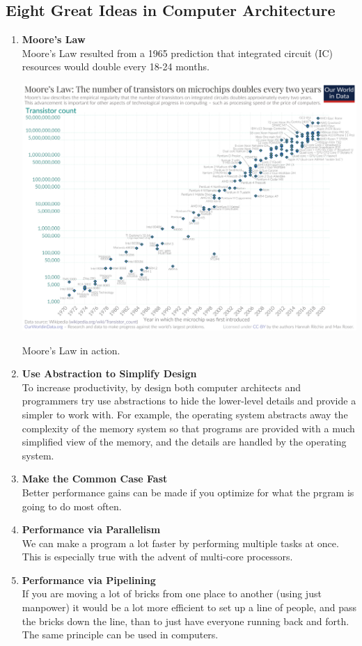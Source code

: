 \documentclass[10pt]{article}
\begin{document}
\subsection{Eight Great Ideas in Computer Architecture}\label{subsec:}
\begin{enumerate}
\item \textbf{Moore's Law}\\
  Moore's Law resulted from a 1965 prediction that integrated circuit (IC) resources would double every 18-24 months.
\begin{marginfigure}
  \begin{center}
    \includegraphics[width=\linewidth]{3.png}
  \end{center}
  \caption{Moore's Law in action.}
\end{marginfigure}%

\item \textbf{Use Abstraction to Simplify Design}\\
  To increase productivity, by design both computer architects and programmers try use abstractions to hide the lower-level details and provide a simpler to work with.  For example, the operating system abstracts away the complexity of the memory system so that programs are provided with a much simplified view of the memory, and the details are handled by the operating system.

\item \textbf{Make the Common Case Fast}\\
  Better performance gains can be made if you optimize for what the prgram is going to do most often.
\item \textbf{Performance via Parallelism}\\
  We can make a program a lot faster by performing multiple tasks at once.  This is especially true with the advent of multi-core processors.
\item \textbf{Performance via Pipelining}\\
  If you are moving a lot of bricks from one place to another (using just manpower) it would be a lot more efficient to set up a line of people, and pass the bricks down the line, than to just have everyone running back and forth.  The same principle can be used in computers.


\end{enumerate}
\end{document}
